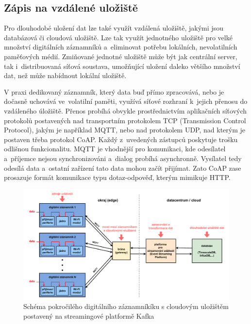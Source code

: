 \subsection{Zápis na vzdálené uložiště}
\label{zapis_na_vzdalene_uloziste}
Pro dlouhodobé uložení dat lze také využít vzdálená uložiště, jakými jsou databázová či cloudová uložiště. Lze tak využít jednotného uložiště pro velké množství digitálních záznamníků a~eliminovat potřebu lokálních, nevolatilních paměťových médií. Zmiňované jednotné uložiště může být jak centrální server, tak i~distribuovaná síťová soustava, umožňující uložení daleko většího množství dat, než může nabídnout lokální uložiště.~\cite{springer_analysis_time_series_db_edge_computing, iot_datalogger_with_timestamping}

V praxi dedikovaný záznamník, který data buď přímo zpracovává, nebo je dočasně uchovává ve~volatilní paměti, využívá síťové rozhraní k~jejich přenosu do vzdáleného úložiště. Přenos probíhá obvykle prostřednictvím aplikačních síťových protokolů postavených nad transportním protokolem TCP (Transmission Control Protocol), jakým je například MQTT, nebo nad protokolem UDP, nad kterým je postaven třeba protokol CoAP. Každý z~uvedených zástupců poskytuje trošku odlišnou funkcionalitu. MQTT je vhodnější pro komunikaci, kde odesílatel a~příjemce nejsou synchronizováni a~dialog probíhá asynchronně. Vysílatel tedy odesílá data a~ostatní zařízení tato data mohou začít přijímat. Zato CoAP zase prosazuje formát komunikace typu dotaz-odpověď, kterým mimikuje HTTP.~\cite{emq_mqtt_vs_coap, smart_datalogger_data_acquisition_cpu, iot_datalogger_with_timestamping}


\begin{figure}[h]
    \centering
    \includegraphics[width=1.00\textwidth]{obrazky-figures/advanced_architecture_of_datalogging.pdf}
    
    \caption{Schéma pokročilého digitálního záznamníkíku s cloudovým uložištěm postavený na streamingové platformě Kafka~\cite{confluent_advanced_datalogging, influxdata_advanced_datalogging_mmqt}}
    \label{fig:advanced-architecture-of-datalogging}
\end{figure}


